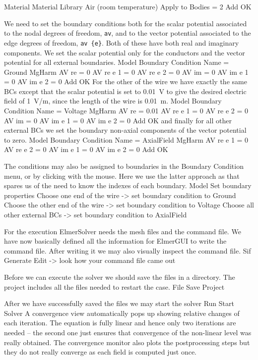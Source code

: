   Material
    Material Library
      Air (room temperature)
    Apply to Bodies = 2
    Add
    OK
\ttend

We need to set the boundary conditions both for the scalar potential associated to the nodal degrees of freedom, \texttt{av},
and to the vector potential associated to the edge degrees of freedom, \texttt{av \{e\}}.
Both of these have both real and imaginary components. 
We set the scalar potential only for the conductors and the vector potential for all external boundaries.
\ttbegin
Model
  Boundary Condition
    Name = Ground 
    MgHarm
      AV re = 0
      AV re {e} 1 = 0
      AV re {e} 2 = 0
      AV im = 0
      AV im {e} 1 = 0
      AV im {e} 2 = 0
    Add
    OK
\ttend   
For the other of the wire we have exactly the same BCs except that the scalar potential is set to 0.01~V to give the desired
electric field of 1~V/m, since the length of the wire is 0.01~m. 
\ttbegin
Model
  Boundary Condition
    Name = Voltage
    MgHarm
      AV re = 0.01
      AV re {e} 1 = 0
      AV re {e} 2 = 0
      AV im = 0
      AV im {e} 1 = 0
      AV im {e} 2 = 0
    Add
    OK
\ttend   
and finally for all other external BCs we set the boundary non-axial components of the vector potential to zero.
\ttbegin
Model
  Boundary Condition
    Name = AxialField
    MgHarm
      AV re {e} 1 = 0
      AV re {e} 2 = 0
      AV im {e} 1 = 0
      AV im {e} 2 = 0
    Add
    OK
\ttend 


The conditions may also be assigned to boundaries in the Boundary Condition menu, or
by clicking with the mouse. Here we use the latter approach as that spares us of the 
need to know the indexes of each boundary.
\ttbegin
Model
  Set boundary properties
    Choose one end of the wire -> set boundary condition to Ground
    Choose the other end of the wire -> set boundary condition to Voltage
    Choose all other external BCs -> set boundary condition to AxialField
\ttend

For the execution 
ElmerSolver needs the mesh files and the command file. We have now basically defined
all the information for ElmerGUI to write the command file. After writing it we may also visually 
inspect the command file.
\ttbegin
Sif 
  Generate
  Edit -> look how your command file came out  
\ttend

Before we can execute the solver we should save the files in a directory. The project includes
all the files needed to restart the case.
\ttbegin
File 
  Save Project
\ttend

After we have successfully saved the files we may start the solver
\ttbegin
Run
  Start Solver
\ttend
A convergence view automatically pops up showing relative changes of each iteration.
The equation is fully linear and hence only two iterations are needed -- the second 
one just ensures that convergence of the non-linear level was really obtained. 
The convergence monitor also plots the postprocessing steps but they do not really converge as each field is computed just once. 

